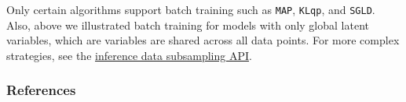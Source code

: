Only certain algorithms support batch training such as
\texttt{MAP}, \texttt{KLqp}, and \texttt{SGLD}. Also, above we
illustrated batch training for models with only global latent variables,
which are variables are shared across all data points.
For more complex strategies, see the
\href{http://edwardlib.org/tutorials/inference-data-subsampling} {inference
data subsampling API}.

\subsubsection{References}\label{references}
